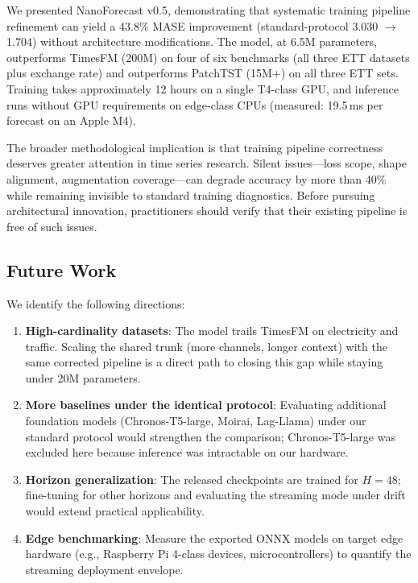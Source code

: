 \documentclass[11pt]{article}
\begin{document}
We presented NanoForecast v0.5, demonstrating that systematic training pipeline refinement can yield a 43.8\% MASE improvement (standard-protocol 3.030 $\to$ 1.704) without architecture modifications. The model, at 6.5M parameters, outperforms TimesFM (200M) on four of six benchmarks (all three ETT datasets plus exchange rate) and outperforms PatchTST (15M+) on all three ETT sets. Training takes approximately 12 hours on a single T4-class GPU, and inference runs without GPU requirements on edge-class CPUs (measured: 19.5\,ms per forecast on an Apple M4).

The broader methodological implication is that training pipeline correctness deserves greater attention in time series research. Silent issues---loss scope, shape alignment, augmentation coverage---can degrade accuracy by more than 40\% while remaining invisible to standard training diagnostics. Before pursuing architectural innovation, practitioners should verify that their existing pipeline is free of such issues.

\subsection{Future Work}

We identify the following directions:

\begin{enumerate}
\item \textbf{High-cardinality datasets}: The model trails TimesFM on electricity and traffic. Scaling the shared trunk (more channels, longer context) with the same corrected pipeline is a direct path to closing this gap while staying under 20M parameters.
\item \textbf{More baselines under the identical protocol}: Evaluating additional foundation models (Chronos-T5-large, Moirai, Lag-Llama) under our standard protocol would strengthen the comparison; Chronos-T5-large was excluded here because inference was intractable on our hardware.
\item \textbf{Horizon generalization}: The released checkpoints are trained for $H=48$; fine-tuning for other horizons and evaluating the streaming mode under drift would extend practical applicability.
\item \textbf{Edge benchmarking}: Measure the exported ONNX models on target edge hardware (e.g., Raspberry Pi 4-class devices, microcontrollers) to quantify the streaming deployment envelope.
\end{enumerate}
\end{document}
